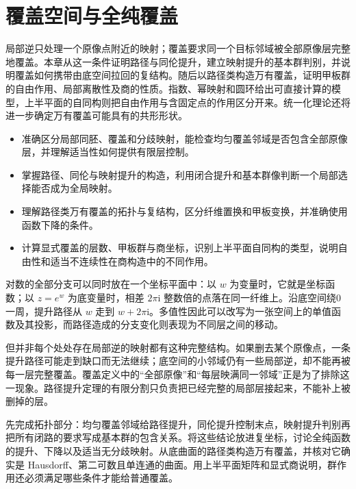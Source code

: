 \chapter{覆盖空间与全纯覆盖}
\label{b3:ch:11}
\begin{chapterabstract}
局部逆只处理一个原像点附近的映射；覆盖要求同一个目标邻域被全部原像层完整地覆盖。本章从这一条件证明路径与同伦提升，建立映射提升的基本群判别，并说明覆盖如何携带由底空间拉回的复结构。随后以路径类构造万有覆盖，证明甲板群的自由作用、局部离散性及商的性质。指数、幂映射和圆环给出可直接计算的模型，上半平面的自同构则把自由作用与含固定点的作用区分开来。统一化理论还将进一步确定万有覆盖可能具有的共形形状。
\end{chapterabstract}

\begin{learninggoals}
\begin{itemize}
\item\label{b3:item:11-goal-1}准确区分局部同胚、覆盖和分歧映射，能检查均匀覆盖邻域是否包含全部原像层，并理解适当性如何提供有限层控制。
\item\label{b3:item:11-goal-2}掌握路径、同伦与映射提升的构造，利用闭合提升和基本群像判断一个局部选择能否成为全局映射。
\item\label{b3:item:11-goal-3}理解路径类万有覆盖的拓扑与复结构，区分纤维置换和甲板变换，并准确使用函数下降的条件。
\item\label{b3:item:11-goal-4}计算显式覆盖的层数、甲板群与商坐标，识别上半平面自同构的类型，说明自由性和适当不连续性在商构造中的不同作用。
\end{itemize}
\end{learninggoals}

对数的全部分支可以同时放在一个坐标平面中：以 \(w\) 为变量时，它就是坐标函数；以 \(z=e^w\) 为底变量时，相差 \(2\pi\mathrm i\) 整数倍的点落在同一纤维上。沿底空间绕0一周，提升路径从 \(w\) 走到 \(w+2\pi\mathrm i\)。多值性因此可以改写为一张空间上的单值函数及其投影，而路径造成的分支变化则表现为不同层之间的移动。

\ProseParagraphBreak
但并非每个处处存在局部逆的映射都有这种完整结构。如果删去某个原像点，一条提升路径可能走到缺口而无法继续；底空间的小邻域仍有一些局部逆，却不能再被每一层完整覆盖。覆盖定义中的“全部原像”和“每层映满同一邻域”正是为了排除这一现象。路径提升定理的有限分割只负责把已经完整的局部层接起来，不能补上被删掉的层。

\ProseParagraphBreak
{}先完成拓扑部分：均匀覆盖邻域给路径提升，同伦提升控制末点，映射提升判别再把所有闭路的要求写成基本群的包含关系。将这些结论放进复坐标，讨论全纯函数的提升、下降以及适当无分歧映射。从底曲面的路径类构造万有覆盖，并核对它确实是 Hausdorff、第二可数且单连通的曲面。用上半平面矩阵和显式商说明，群作用还必须满足哪些条件才能给普通覆盖。


